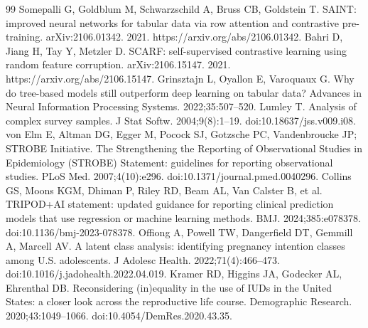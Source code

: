 \documentclass[referee,pdflatex,sn-basic,Numbered]{sn-jnl}
\begin{document}
\begin{thebibliography}{99}
 Somepalli G, Goldblum M, Schwarzschild A, Bruss CB, Goldstein T. SAINT: improved neural networks for tabular data via row attention and contrastive pre-training. arXiv:2106.01342. 2021. https://arxiv.org/abs/2106.01342.
 Bahri D, Jiang H, Tay Y, Metzler D. SCARF: self-supervised contrastive learning using random feature corruption. arXiv:2106.15147. 2021. https://arxiv.org/abs/2106.15147.
 Grinsztajn L, Oyallon E, Varoquaux G. Why do tree-based models still outperform deep learning on tabular data? Advances in Neural Information Processing Systems. 2022;35:507--520.
 Lumley T. Analysis of complex survey samples. J Stat Softw. 2004;9(8):1--19. doi:10.18637/jss.v009.i08.
 von Elm E, Altman DG, Egger M, Pocock SJ, Gotzsche PC, Vandenbroucke JP; STROBE Initiative. The Strengthening the Reporting of Observational Studies in Epidemiology (STROBE) Statement: guidelines for reporting observational studies. PLoS Med. 2007;4(10):e296. doi:10.1371/journal.pmed.0040296.
 Collins GS, Moons KGM, Dhiman P, Riley RD, Beam AL, Van Calster B, et al. TRIPOD+AI statement: updated guidance for reporting clinical prediction models that use regression or machine learning methods. BMJ. 2024;385:e078378. doi:10.1136/bmj-2023-078378.
 Offiong A, Powell TW, Dangerfield DT, Gemmill A, Marcell AV. A latent class analysis: identifying pregnancy intention classes among U.S. adolescents. J Adolesc Health. 2022;71(4):466--473. doi:10.1016/j.jadohealth.2022.04.019.
 Kramer RD, Higgins JA, Godecker AL, Ehrenthal DB. Reconsidering (in)equality in the use of IUDs in the United States: a closer look across the reproductive life course. Demographic Research. 2020;43:1049--1066. doi:10.4054/DemRes.2020.43.35.
\end{thebibliography}
\end{document}

